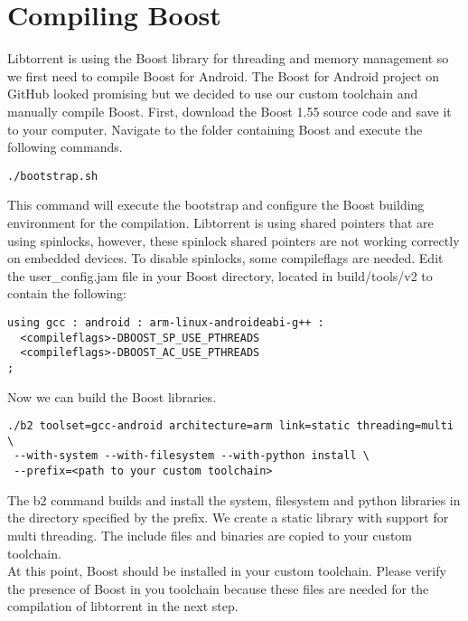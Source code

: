 \section{Compiling Boost}
	Libtorrent is using the Boost library for threading and memory management so we first need to compile Boost for Android. The Boost for Android project on GitHub looked promising but we decided to use our custom toolchain and manually compile Boost. First, download the Boost 1.55 source code and save it to your computer. Navigate to the folder containing Boost and execute the following commands.
	\begin{lstlisting}
./bootstrap.sh
	\end{lstlisting}
	This command will execute the bootstrap and configure the Boost building environment for the compilation. Libtorrent is using shared pointers that are using spinlocks, however, these spinlock shared pointers are not working correctly on embedded devices. To disable spinlocks, some  compileflags are needed. Edit the user\_config.jam file in your Boost directory, located in build/tools/v2 to contain the following:
	\begin{lstlisting}
using gcc : android : arm-linux-androideabi-g++ : 
  <compileflags>-DBOOST_SP_USE_PTHREADS 
  <compileflags>-DBOOST_AC_USE_PTHREADS
;
	\end{lstlisting}
	Now we can build the Boost libraries.
	\begin{lstlisting}
./b2 toolset=gcc-android architecture=arm link=static threading=multi \
 --with-system --with-filesystem --with-python install \
 --prefix=<path to your custom toolchain>
	\end{lstlisting}
	The b2 command builds and install the system, filesystem and python libraries in the directory specified by the prefix. We create a static library with support for multi threading. The include files and binaries are copied to your custom toolchain.\\
	At this point, Boost should be installed in your custom toolchain. Please verify the presence of Boost in you toolchain because these files are needed for the compilation of libtorrent in the next step.